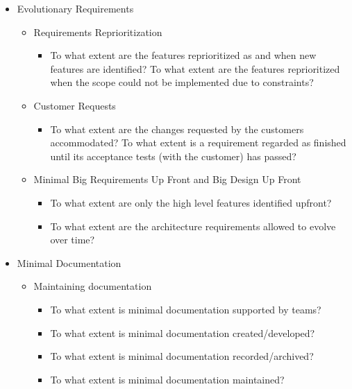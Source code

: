 \begin{appendices}
\begin{itemize}
\begin{itemize}
\begin{itemize}
				\end{itemize}
		\end{itemize}
	\item Evolutionary Requirements
		\begin{itemize}
			\item Requirements Reprioritization 
				\begin{itemize}
					\item To what extent are the features reprioritized as and when new features are identified?
					\addition To what extent are the features reprioritized when the scope could not be implemented due to constraints?
				\end{itemize}
			\item Customer Requests
				\begin{itemize}
					\item To what extent are the changes requested by the customers accommodated?
					\addition To what extent is a requirement regarded as finished until its acceptance tests (with the customer) has passed?
				\end{itemize}
			\item Minimal Big Requirements Up Front and Big Design Up Front
				\begin{itemize}
					\item To what extent are only the high level features identified upfront?
					\item To what extent are the architecture requirements allowed to evolve over time?
				\end{itemize}
		\end{itemize}
	\item Minimal Documentation
		\begin{itemize}
			\item Maintaining documentation 
				\begin{itemize}
					\item To what extent is minimal documentation supported by teams?
					\item To what extent is minimal documentation created/developed?
					\item To what extent is minimal documentation recorded/archived?
					\item To what extent is minimal documentation maintained?
				\end{itemize}
		\end{itemize}
\end{itemize}

\end{appendices}
